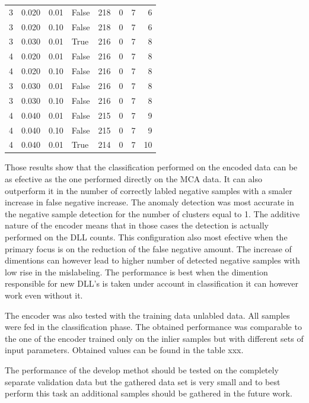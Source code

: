 \documentclass[a4paper,twoside,12pt]{book}
\begin{document}
\begin{table}
\begin{tabular}{rrrlrrrr}
				3 &  0.020 &     0.01 &    False &  218 &  0 &   7 &   6 \\
				3 &  0.020 &     0.10 &    False &  218 &  0 &   7 &   6 \\
				3 &  0.030 &     0.01 &     True &  216 &  0 &   7 &   8 \\
				4 &  0.020 &     0.01 &    False &  216 &  0 &   7 &   8 \\
				4 &  0.020 &     0.10 &    False &  216 &  0 &   7 &   8 \\
				3 &  0.030 &     0.01 &    False &  216 &  0 &   7 &   8 \\
				3 &  0.030 &     0.10 &    False &  216 &  0 &   7 &   8 \\
				4 &  0.040 &     0.01 &    False &  215 &  0 &   7 &   9 \\
				4 &  0.040 &     0.10 &    False &  215 &  0 &   7 &   9 \\
				4 &  0.040 &     0.01 &     True &  214 &  0 &   7 &  10 \\
		\bottomrule
	\end{tabular}
\end{table}		

Those results show that the classification performed on the encoded data can be as efective
as the one performed directly on the MCA data. It can also outperform it in the number of 
correctly labled negative samples with a smaler increase in false negative increase. The anomaly 
detection was most accurate in the negative sample detection for the number of clusters equal to 1.
The additive nature of the encoder means that in those cases the detection is actually performed 
on the DLL counts. This configuration also most efective when the primary focus is on the reduction
of the false negative amount. The increase of dimentions can however lead to higher number of detected
negative samples with low rise in the mislabeling. The performance is best when the dimention 
responsible for new DLL's is taken under account in classification it can however work even 
without it. 

The encoder was also tested with the training data unlabled data. All samples were fed in the 
classification phase. The obtained performance was comparable to the one of the encoder trained 
only on the inlier samples but with different sets of input parameters. Obtained values can be found
in the table xxx.


The performance of the develop methot should be tested on the completely separate validation data but 
the gathered data set is very small and to best perform this task an additional samples should 
be gathered in the future work.
\end{document}
